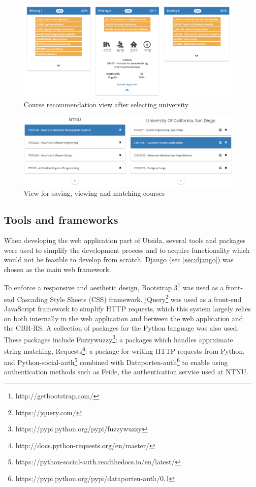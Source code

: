 \begin{figure}[h]
    \centering
    \includegraphics[width=1\textwidth]{fig/utsida_screenshots/result_2_cut_high.png}
    \caption[Course recommendation view]{Course recommendation view after selecting university}
    \label{fig:web_results_2}
\end{figure}

\begin{figure}[H]
    \centering
    \includegraphics[width=1\textwidth]{fig/utsida_screenshots/course_match_cut.png}
    \caption{View for saving, viewing and matching courses}
    \label{fig:web_courses}
\end{figure}

\subsection{Tools and frameworks}
When developing the web application part of Utsida, several tools and packages were used to simplify the development process and to acquire functionality which would not be feasible to develop from scratch. Django (sec \ref{sec:django}) was chosen as the main web framework.

To enforce a responsive and aesthetic design, Bootstrap 3\footnote{http://getbootstrap.com/} was used as a front-end Cascading Style Sheets (CSS) framework. jQuery\footnote{https://jquery.com/} was used as a front-end JavaScript framework to simplify HTTP requests, which this system largely relies on both internally in the web application and between the web application and the CBR-RS. A collection of packages for the Python language was also used. These packages include Fuzzywuzzy\footnote{https://pypi.python.org/pypi/fuzzywuzzy}: a packages which handles apprximate string matching, Requests\footnote{http://docs.python-requests.org/en/master/}: a package for writing HTTP requests from Python, and Python-social-auth\footnote{https://python-social-auth.readthedocs.io/en/latest/} combined with Dataporten-auth\footnote{https://pypi.python.org/pypi/dataporten-auth/0.1} to enable using authentication methods such as Feide, the authentication service used at NTNU.


